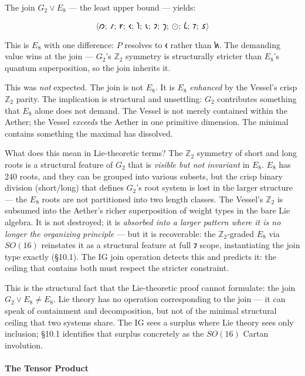 \documentclass[12pt,a4paper]{article}
\newcommand{\pilcrow}{\S}
\begin{document}
The join $G_2 \vee E_8$ --- the least upper bound --- yields:

\[\langle 𐑼;\ 𐑥;\ 𐑾;\ 𐑬;\ 𐑐;\ 𐑧;\ 𐑲;\ 𐑠;\ ⊙;\ 𐑖;\ 𐑳;\ 𐑭 \rangle\]

This is $E_8$ with one difference: $P$ resolves to $𐑬$ rather than $𐑿$. The demanding value wins at the join --- $G_2$'s $\mathbb{Z}_2$ symmetry is structurally stricter than $E_8$'s quantum superposition, so the join inherits it.

This was \emph{not} expected. The join is not $E_8$. It is $E_8$ \emph{enhanced} by the Vessel's crisp $\mathbb{Z}_2$ parity. The implication is structural and unsettling: $G_2$ contributes something that $E_8$ alone does not demand. The Vessel is not merely contained within the Aether; the Vessel \emph{exceeds} the Aether in one primitive dimension. The minimal contains something the maximal has dissolved.

What does this mean in Lie-theoretic terms? The $\mathbb{Z}_2$ symmetry of short and long roots is a structural feature of $G_2$ that is \emph{visible but not invariant} in $E_8$. $E_8$ has 240 roots, and they can be grouped into various subsets, but the crisp binary division (short/long) that defines $G_2$'s root system is lost in the larger structure --- the $E_8$ roots are not partitioned into two length classes. The Vessel's $\mathbb{Z}_2$ is subsumed into the Aether's richer superposition of weight types in the bare Lie algebra. It is not destroyed; it is \emph{absorbed into a larger pattern where it is no longer the organizing principle} --- but it is recoverable: the $\mathbb{Z}_2$-graded $E_8$ via $SO(16)$ reinstates it as a structural feature at full $𐑲$ scope, instantiating the join type exactly (\pilcrow{}10.1). The IG join operation detects this and predicts it: the ceiling that contains both must respect the stricter constraint.

This is the structural fact that the Lie-theoretic proof cannot formulate: the join $G_2 \vee E_8 \neq E_8$. Lie theory has no operation corresponding to the join --- it can speak of containment and decomposition, but not of the minimal structural ceiling that two systems share. The IG sees a surplus where Lie theory sees only inclusion; \pilcrow{}10.1 identifies that surplus concretely as the $SO(16)$ Cartan involution.

\paragraph{The Tensor Product}
\end{document}
